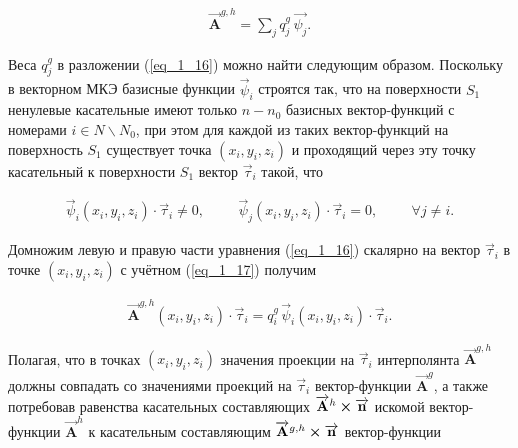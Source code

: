 \begin{equation} \label{eq_1_16}
	\begin{gathered}
		\overrightarrow{\textbf{A}}^{g,h} = \sum \limits_j q_j^g \, \overrightarrow{\psi_j}.
	\end{gathered}
\end{equation}

Веса $q_j^g$ в разложении (\ref{eq_1_16}) можно найти следующим образом. Поскольку в векторном МКЭ базисные функции $\overrightarrow{\psi}_i$ строятся так, что на поверхности $S_1$ ненулевые касательные имеют только $n-n_0$ базисных вектор-функций с номерами $i \in N \backslash N_0$, при этом для каждой из таких вектор-функций на поверхность $S_1$ существует точка $\left(x_i, y_i, z_i\right)$ и проходящий через эту точку касательный к поверхности $S_1$ вектор $\overrightarrow{\tau}_i$ такой, что

\begin{equation} \label{eq_1_17}
	\begin{gathered}
		\overrightarrow{\psi}_i \left(x_i, y_i, z_i\right) \cdot \overrightarrow{\tau}_i \neq 0, \hspace{1cm} \overrightarrow{\psi}_j \left(x_i, y_i, z_i\right) \cdot \overrightarrow{\tau}_i = 0, \hspace{1cm} \forall j \neq i.
	\end{gathered}
\end{equation}

Домножим левую и правую части уравнения (\ref{eq_1_16}) скалярно на вектор $\overrightarrow{\tau}_i$ в точке $\left(x_i, y_i, z_i\right)$ с учётном (\ref{eq_1_17}) получим 

\begin{equation} \label{eq_1_18}
	\begin{gathered}
		\overrightarrow{\textbf{A}}^{g,h} \left(x_i, y_i, z_i\right) \cdot \overrightarrow{\tau}_i = q_i^g \, \overrightarrow{\psi}_i \left(x_i, y_i, z_i\right) \cdot \overrightarrow{\tau}_i.
	\end{gathered}
\end{equation}

Полагая, что в точках $\left(x_i, y_i, z_i\right)$ значения проекции на $\overrightarrow{\tau}_i$ интерполянта $\overrightarrow{\textbf{A}}^{g,h}$ должны совпадать со значениями проекций на $\overrightarrow{\tau}_i$ вектор-функции $\overrightarrow{\textbf{A}}^g$, а также потребовав равенства касательных составляющих $\overrightarrow{\textbf{A}}^h \cross \overrightarrow{\textbf{n}}$ искомой вектор-функции $\overrightarrow{\textbf{A}}^h$ к касательным составляющим $\overrightarrow{\textbf{A}}^{g,h} \cross \overrightarrow{\textbf{n}}$ вектор-функции

